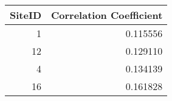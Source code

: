 \begin{tabular}{rr}
\toprule
 SiteID &  Correlation Coefficient \\
\midrule
      1 &                 0.115556 \\
     12 &                 0.129110 \\
      4 &                 0.134139 \\
     16 &                 0.161828 \\
\bottomrule
\end{tabular}
